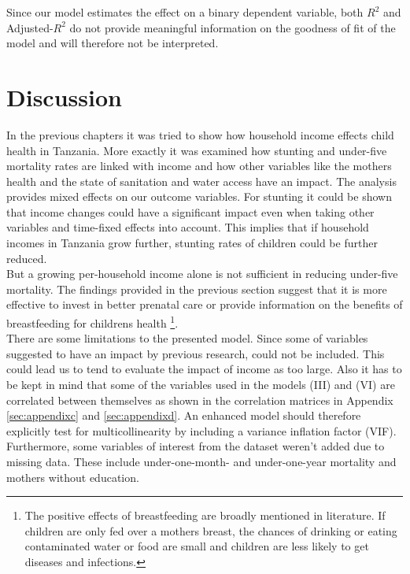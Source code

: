 \documentclass[a4paper, 11pt]{article} %
\begin{document}
Since our model estimates the effect on a binary dependent variable, both $R^{2}$ and Adjusted-$R^{2}$ do not provide meaningful information on the goodness of fit of the model and will therefore not be interpreted.


\section{Discussion}
In the previous chapters it was tried to show how household income effects child health in Tanzania. More exactly it was examined how stunting and under-five mortality rates are linked with income and how other variables like the mothers health and the state of sanitation and water access have an impact. The analysis provides mixed effects on our outcome variables. For stunting it could be shown that income changes could have a significant impact even when taking other variables and time-fixed effects into account. This implies that if household incomes in Tanzania grow further, stunting rates of children could be further reduced. \\

But a growing per-household income alone is not sufficient in reducing under-five mortality. The findings provided in the previous section suggest that it is more effective to invest in better prenatal care or provide information on the benefits of breastfeeding for childrens health \footnote{The positive effects of breastfeeding are broadly mentioned in literature. If children are only fed over a mothers breast, the chances of drinking or eating contaminated water or food are small and children are less likely to get diseases and infections.}. \\

There are some limitations to the presented model. Since some of variables suggested to have an impact by previous research, could not be included. This could lead us to tend to evaluate the impact of income as too large. Also it has to be kept in mind that some of the variables used in the models (III) and (VI) are correlated between themselves as shown in the correlation matrices in Appendix \ref{sec:appendixc} and \ref{sec:appendixd}. An enhanced model should therefore explicitly test for multicollinearity by including a variance inflation factor (VIF). Furthermore, some variables of interest from the dataset weren't added due to missing data. These include under-one-month- and under-one-year mortality and mothers without education. \\
\end{document}

